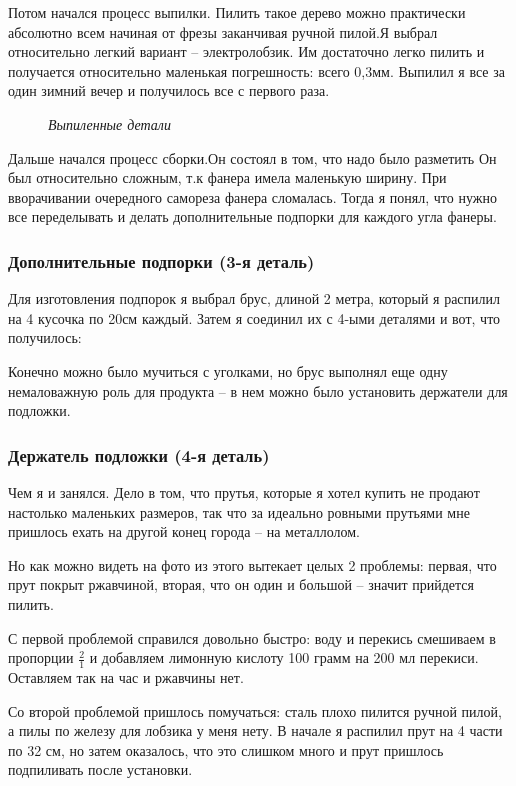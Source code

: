 \documentclass[a4paper, 12pt]{article}
\newcommand{\image}[3]{
	\begin{figure}[ht]
		\center{\texttt{[image: img/\#1]} }
		\caption{\textit{#3}}\end{figure}
}
\begin{document}
Потом начался процесс выпилки. Пилить такое дерево можно практически абсолютно
всем начиная от фрезы заканчивая ручной пилой.Я выбрал относительно легкий
вариант -- электролобзик. Им достаточно легко пилить и получается относительно
маленькая погрешность: всего 0,3мм. Выпилил я все за один зимний вечер и
получилось все с первого раза.

\image{разметка фанеры.jpg}{180}{Выпиленные детали}

Дальше начался процесс сборки.Он состоял в том, что надо было разметить  Он был
относительно сложным, т.к фанера имела маленькую ширину.
При вворачивании очередного самореза фанера сломалась. Тогда
я понял, что нужно все переделывать и делать дополнительные подпорки для
каждого угла фанеры.

\subsubsection{Дополнительные подпорки (3-я деталь)}

Для изготовления подпорок я выбрал брус, длиной 2 метра, который я распилил
на 4 кусочка по 20см каждый. Затем я соединил их с 4-ыми деталями и вот, что
получилось:

Конечно можно было мучиться с уголками, но брус выполнял еще одну немаловажную
роль для продукта -- в нем можно было установить держатели для подложки.

\subsubsection{Держатель подложки (4-я деталь)}

Чем я и занялся. Дело в том, что прутья, которые я хотел купить не продают
настолько маленьких размеров, так что за идеально ровными прутьями мне пришлось
ехать на другой конец города -- на металлолом.

Но как можно видеть на фото из этого вытекает целых 2 проблемы: первая, что
прут покрыт ржавчиной, вторая, что он один и большой -- значит прийдется
пилить.

С первой проблемой справился довольно быстро: воду и перекись смешиваем в
пропорции $\frac{2}{1}$ и добавляем лимонную кислоту 100 грамм на 200 мл
перекиси. Оставляем так на час и ржавчины нет.

Со второй проблемой пришлось помучаться: сталь плохо пилится ручной пилой,
а пилы по железу для лобзика у меня нету. В начале я распилил прут на 4 части
по 32 см, но затем оказалось, что это слишком много и прут пришлось подпиливать
после установки.
\end{document}
